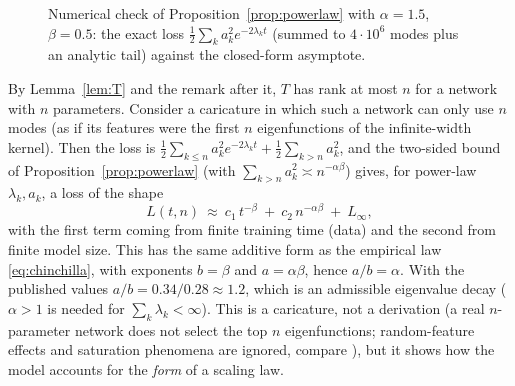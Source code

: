 \begin{figure}[tb]
\centering
{}
\caption{Numerical check of Proposition~\ref{prop:powerlaw} with $\alpha=1.5$, $\beta=0.5$: the exact loss $\frac12\sum_ka_k^2e^{-2\lambda_kt}$ (summed to $4\cdot10^6$ modes plus an analytic tail) against the closed-form asymptote.}
\label{fig:L2-check}
\end{figure}

\begin{beyond}
By Lemma~\ref{lem:T} and the remark after it, $T$ has rank at most $n$ for a network with $n$ parameters. Consider a caricature in which such a network can only use $n$ modes (as if its features were the first $n$ eigenfunctions of the infinite-width kernel). Then the loss is
$\frac12\sum_{k\le n}a_k^2e^{-2\lambda_kt}+\frac12\sum_{k>n}a_k^2$, and the two-sided bound of Proposition~\ref{prop:powerlaw} (with $\sum_{k>n}a_k^2\asymp n^{-\alpha\beta}$) gives, for power-law $\lambda_k,a_k$, a loss of the shape
\[
   L(t,n)\ \approx\ c_1\,t^{-\beta}\ +\ c_2\,n^{-\alpha\beta}\ +\ L_\infty ,
\]
with the first term coming from finite training time (data) and the second from finite model size. This has the same additive form as the empirical law \eqref{eq:chinchilla}, with exponents $b=\beta$ and $a=\alpha\beta$, hence $a/b=\alpha$. With the published values $a/b=0.34/0.28\approx1.2$, which is an admissible eigenvalue decay ($\alpha>1$ is needed for $\sum_k\lambda_k<\infty$). This is a caricature, not a derivation (a real $n$-parameter network does not select the top $n$ eigenfunctions; random-feature effects and saturation phenomena are ignored, compare \citealt{bahri2024}), but it shows how the model accounts for the \emph{form} of a scaling law.
\end{beyond}


